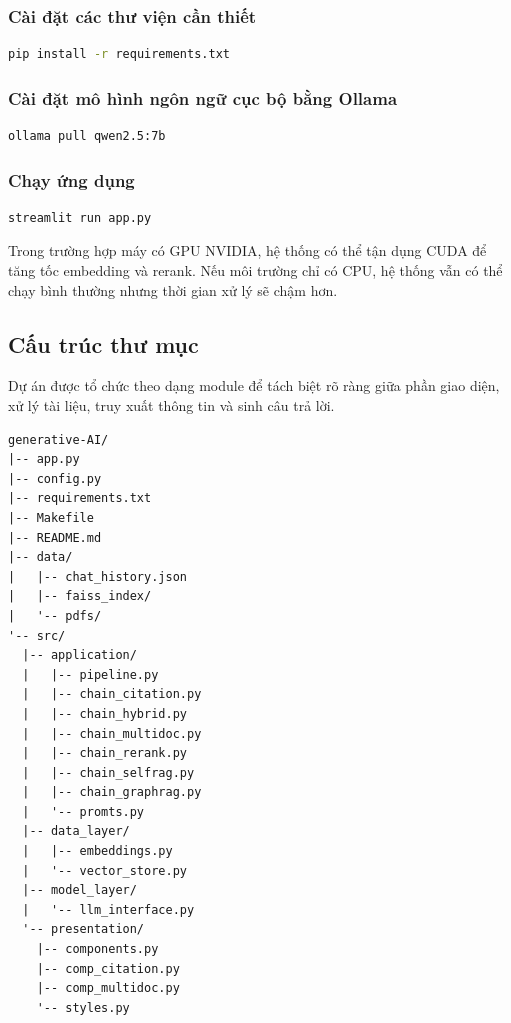 \documentclass[conference]{IEEEtran}
\begin{document}
\subsubsection{Cài đặt các thư viện cần thiết}
\begin{lstlisting}[language=bash]
pip install -r requirements.txt
\end{lstlisting}

\subsubsection{Cài đặt mô hình ngôn ngữ cục bộ bằng Ollama}
\begin{lstlisting}[language=bash]
ollama pull qwen2.5:7b
\end{lstlisting}

\subsubsection{Chạy ứng dụng}
\begin{lstlisting}[language=bash]
streamlit run app.py
\end{lstlisting}

Trong trường hợp máy có GPU NVIDIA, hệ thống có thể tận dụng CUDA để tăng tốc embedding và rerank. Nếu môi trường chỉ có CPU, hệ thống vẫn có thể chạy bình thường nhưng thời gian xử lý sẽ chậm hơn.

\subsection{Cấu trúc thư mục}

Dự án được tổ chức theo dạng module để tách biệt rõ ràng giữa phần giao diện, xử lý tài liệu, truy xuất thông tin và sinh câu trả lời.

\begin{lstlisting}
generative-AI/
|-- app.py
|-- config.py
|-- requirements.txt
|-- Makefile
|-- README.md
|-- data/
|   |-- chat_history.json
|   |-- faiss_index/
|   '-- pdfs/
'-- src/
  |-- application/
  |   |-- pipeline.py
  |   |-- chain_citation.py
  |   |-- chain_hybrid.py
  |   |-- chain_multidoc.py
  |   |-- chain_rerank.py
  |   |-- chain_selfrag.py
  |   |-- chain_graphrag.py
  |   '-- promts.py
  |-- data_layer/
  |   |-- embeddings.py
  |   '-- vector_store.py
  |-- model_layer/
  |   '-- llm_interface.py
  '-- presentation/
    |-- components.py
    |-- comp_citation.py
    |-- comp_multidoc.py
    '-- styles.py
\end{lstlisting}
\end{document}
